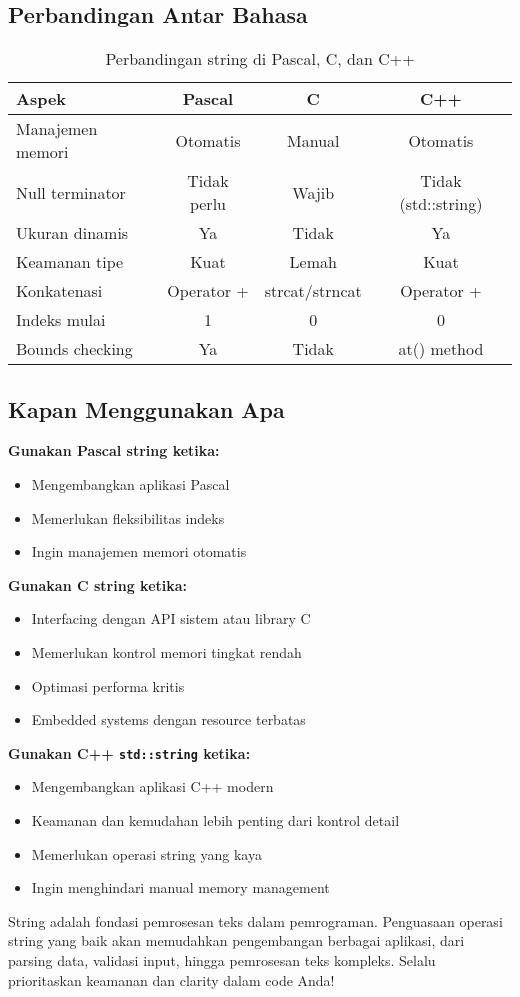 \documentclass[../main.tex]{subfiles}
\begin{document}
\subsection{Perbandingan Antar Bahasa}

\begin{table}[H]
\centering
\begin{tabular}{|l|c|c|c|}
\hline
\textbf{Aspek} & \textbf{Pascal} & \textbf{C} & \textbf{C++} \\
\hline
Manajemen memori & Otomatis & Manual & Otomatis \\
\hline
Null terminator & Tidak perlu & Wajib & Tidak (std::string) \\
\hline
Ukuran dinamis & Ya & Tidak & Ya \\
\hline
Keamanan tipe & Kuat & Lemah & Kuat \\
\hline
Konkatenasi & Operator + & strcat/strncat & Operator + \\
\hline
Indeks mulai & 1 & 0 & 0 \\
\hline
Bounds checking & Ya & Tidak & at() method \\
\hline
\end{tabular}
\caption{Perbandingan string di Pascal, C, dan C++}
\end{table}

\subsection{Kapan Menggunakan Apa}

\textbf{Gunakan Pascal string ketika:}
\begin{itemize}
  \item Mengembangkan aplikasi Pascal
  \item Memerlukan fleksibilitas indeks
  \item Ingin manajemen memori otomatis
\end{itemize}

\textbf{Gunakan C string ketika:}
\begin{itemize}
  \item Interfacing dengan API sistem atau library C
  \item Memerlukan kontrol memori tingkat rendah
  \item Optimasi performa kritis
  \item Embedded systems dengan resource terbatas
\end{itemize}

\textbf{Gunakan C++ \texttt{std::string} ketika:}
\begin{itemize}
  \item Mengembangkan aplikasi C++ modern
  \item Keamanan dan kemudahan lebih penting dari kontrol detail
  \item Memerlukan operasi string yang kaya
  \item Ingin menghindari manual memory management
\end{itemize}

String adalah fondasi pemrosesan teks dalam pemrograman. Penguasaan operasi string yang baik akan memudahkan pengembangan berbagai aplikasi, dari parsing data, validasi input, hingga pemrosesan teks kompleks. Selalu prioritaskan keamanan dan clarity dalam code Anda!
\end{document}
